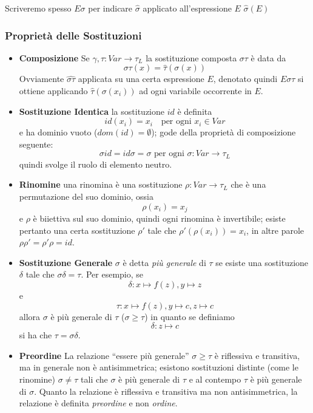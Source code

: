 Scriveremo spesso $E\sigma$ per indicare $\hat{\sigma}$ applicato all'espressione $E$ 
$\hat{\sigma}(E)$

\subsubsection{Proprietà delle Sostituzioni}
\begin{itemize}
        \item{\textbf{Composizione}} Se $\gamma, \tau : Var \rightarrow \tau_L$
                la sostituzione composta $\sigma\tau$ è data da 
                $$
                \sigma\tau(x) = \hat{\tau}(\sigma(x))
                $$
        Ovviamente $\hat{\sigma\tau}$ applicata su una certa espressione $E$, 
        denotato quindi $E\sigma\tau$ si ottiene applicando $\hat{\tau}(\sigma(x_i))$ 
        ad ogni variabile occorrente in $E$. 
        \item{\textbf{Sostituzione Identica}} la sostituzione $id$ è definita 
                $$
                id(x_i) = x_i ~~~  \text{ per ogni } x_i \in Var
                $$
        e ha dominio vuoto ($dom(id) = \emptyset$); gode della proprietà di 
        composizione seguente: 
        $$
        \sigma id = id \sigma = \sigma \text{ per ogni } \sigma:Var \rightarrow \tau_L
        $$
        quindi svolge il ruolo di elemento neutro. 

        \item{\textbf{Rinomine}} una rinomina è una sostituzione $\rho: Var \rightarrow \tau_L$
                che è una permutazione del suo dominio, ossia 
                $$
                \rho(x_i) = x_j
                $$
                e $\rho$ è biiettiva sul suo dominio, quindi ogni 
                rinomina è invertibile; esiste pertanto una certa 
                sostituzione $\rho'$ tale che $\rho'(\rho(x_i)) = x_i$, in altre 
                parole $\rho\rho' = \rho'\rho = id$.
        \item{\textbf{Sostituzione Generale}} $\sigma$ è detta 
                \textit{più generale} di $\tau$ se esiste una sostituzione 
                $\delta$ tale che $\sigma\delta = \tau$. 
        Per esempio, se 
        $$
        \delta: x \mapsto f(z), y \mapsto z
        $$
        e 
        $$
        \tau : x \mapsto f(z), y \mapsto c, z \mapsto c
        $$
        allora $\sigma$ è più generale di $\tau$ ($\sigma \geq \tau$)
        in quanto se definiamo 
        $$
        \delta: z \mapsto c
        $$
        si ha che $\tau = \sigma\delta$.
        \item{\textbf{Preordine}} La relazione ``essere più generale'' $\sigma \geq \tau$ è riflessiva e 
                transitiva, ma in generale non è antisimmetrica; 
                esistono sostituzioni distinte (come le rinomine)
                $\sigma \neq \tau$ tali che $\sigma$ è più generale di 
                $\tau$ e al contempo $\tau$ è più generale di $\sigma$. 
                Quanto la relazione è riflessiva e transitiva ma non antisimmetrica, 
                la relazione è definita \textit{preordine} e non \textit{ordine}. 


\end{itemize}

